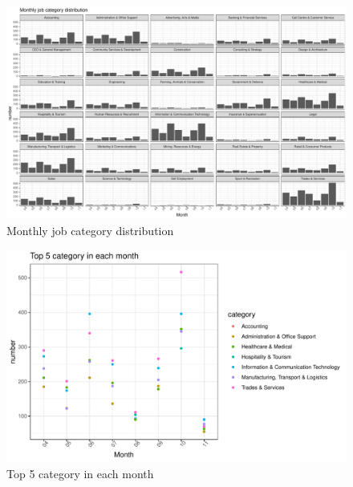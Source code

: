 \documentclass[11pt,a4paper,]{article}
\begin{document}
\begin{figure}
\centering
\includegraphics{Team_JHDP_Assignment4_files/figure-latex/monthly-1.pdf}
\caption{\label{fig:monthly}Monthly job category distribution}
\end{figure}

\begin{figure}
\centering
\includegraphics{Team_JHDP_Assignment4_files/figure-latex/number-1.pdf}
\caption{\label{fig:number}Top 5 category in each month}
\end{figure}
\end{document}
